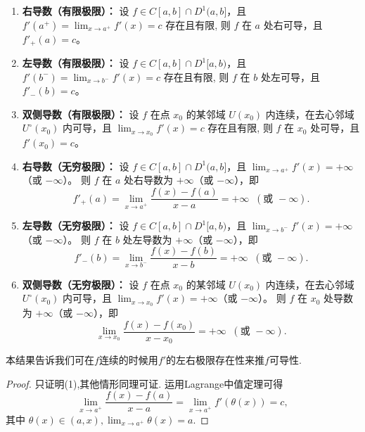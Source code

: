 \documentclass[../../main.tex]{subfiles}%
\begin{document}
\begin{theorem}[导数极限定理]\label{theorem:导数极限定理}
\begin{enumerate}[(1)]
\item \textbf{右导数（有限极限）：} 
设 $f\in C[a,b]\cap D^1(a,b]$，且 $f'(a^+)=\displaystyle \lim_{x\to a^+} f'(x)=c$ 存在且有限,  
则 $f$ 在 $a$ 处右可导，且 $f'_+(a)=c$。

\item \textbf{左导数（有限极限）：} 
设 $f\in C[a,b]\cap D^1[a,b)$，且 $f'(b^-)=\displaystyle \lim_{x\to b^-} f'(x)=c$ 存在且有限,  
则 $f$ 在 $b$ 处左可导，且 $f'_-(b)=c$。

\item \textbf{双侧导数（有限极限）：} 
设 $f$ 在点 $x_0$ 的某邻域 $U(x_0)$ 内连续，在去心邻域 $U^\circ(x_0)$ 内可导，且 $\displaystyle \lim_{x\to x_0} f'(x)=c$ 存在且有限,
则 $f$ 在 $x_0$ 处可导，且 $f'(x_0)=c$。

\item \textbf{右导数（无穷极限）：} 
设 $f\in C[a,b]\cap D^1(a,b]$，且 $\displaystyle \lim_{x\to a^+} f'(x)=+\infty$（或 $-\infty$）。  
则 $f$ 在 $a$ 处右导数为 $+\infty$（或 $-\infty$），即
\[
f'_+(a)=\lim_{x\to a^+}\frac{f(x)-f(a)}{x-a}=+\infty\;\;(\text{或 }-\infty).
\]

\item \textbf{左导数（无穷极限）：} 
设 $f\in C[a,b]\cap D^1[a,b)$，且 $\displaystyle \lim_{x\to b^-} f'(x)=+\infty$（或 $-\infty$）。  
则 $f$ 在 $b$ 处左导数为 $+\infty$（或 $-\infty$），即
\[
f'_-(b)=\lim_{x\to b^-}\frac{f(x)-f(b)}{x-b}=+\infty\;\;(\text{或 }-\infty).
\]

\item \textbf{双侧导数（无穷极限）：} 
设 $f$ 在点 $x_0$ 的某邻域 $U(x_0)$ 内连续，在去心邻域 $U^\circ(x_0)$ 内可导，且 $\displaystyle \lim_{x\to x_0} f'(x)=+\infty$（或 $-\infty$）。  
则 $f$ 在 $x_0$ 处导数为 $+\infty$（或 $-\infty$），即
\[
\lim_{x\to x_0}\frac{f(x)-f(x_0)}{x-x_0}=+\infty\;\;(\text{或 }-\infty).
\]
\end{enumerate}
\end{theorem}
\begin{remark}
本结果告诉我们可在\(f\)连续的时候用\(f'\)的左右极限存在性来推\(f\)可导性.
\end{remark}
\begin{proof}
只证明(1),其他情形同理可证.
运用Lagrange中值定理可得
\[\lim_{x\rightarrow a^{+}}\frac{f(x)-f(a)}{x - a}=\lim_{x\rightarrow a^{+}}f'(\theta(x))=c,\]
其中
\(\theta(x)\in(a,x),\lim_{x\rightarrow a^{+}}\theta(x)=a.\)
\end{proof}
\end{document}
